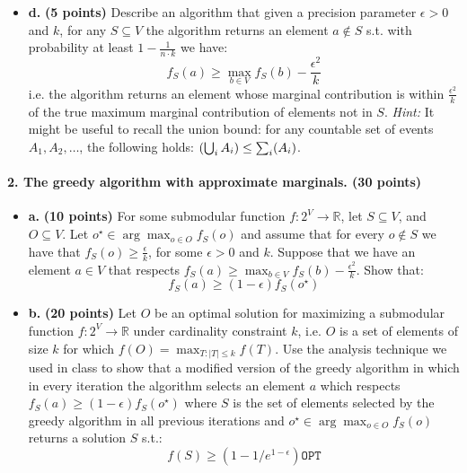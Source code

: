 \documentclass[11pt]{article}
\let\Pr\relax
\DeclareMathOperator*{\Pr}{\mathbb{P}}
\begin{document}
\begin{itemize}
		\item[] \textbf{d.} \textbf{(5 points)} Describe an algorithm that given a precision parameter $\epsilon>0$ and $k$, for any $S \subseteq V$ the algorithm returns an element $a \notin S$ s.t. with probability at least $1-\frac{1}{n\cdot k}$ we have: 
		$$f_{S}(a) \geq \max_{b\in V}f_{S}(b) -\frac{\epsilon^2}{k}$$
		i.e. the algorithm returns an element whose marginal contribution is within $\frac{\epsilon^2}{k}$ of the true maximum marginal contribution of elements not in $S$. \emph{Hint:} It might be useful to recall the union bound: for any countable set of events $A_1, A_2, \dots$, the following holds: $\Pr \left ( \bigcup_i A_i \right ) \le \sum_i \Pr(A_i)$.
	\end{itemize}
	
	
	
	\paragraph{2. The greedy algorithm with approximate marginals. (30 points)}
	\begin{itemize}
		
		\item[]\textbf{a.} \textbf{(10 points)} For some submodular function $f:2^V \to \mathbb{R}$, let $S\subseteq V$, and $O \subseteq V$.  Let $o^\star \in \arg\max_{o \in O}f_{S}(o)$ and assume that for every $o\notin S$ we have that $f_{S}(o) \geq \frac{\epsilon}{k}$, for some $\epsilon>0$ and $k$.  Suppose that we have an element $a\in V$ that respects $f_{S}(a) \geq \max_{b\in V}f_{S}(b) - \frac{\epsilon^2}{k}$.  Show that: 
		$$f_{S}(a)\geq (1-\epsilon)f_{S}(o^\star)$$
		
		\item[] \textbf{b.} \textbf{(20 points)} Let $O$ be an optimal solution for maximizing a submodular function $f:2^V \to \mathbb{R}$ under cardinality constraint $k$, i.e. $O$ is a set of elements of size $k$ for which $f(O)=
		\max_{T:|T|\leq k}f(T)$.  Use the analysis technique we used in class to show that a modified version of the greedy algorithm in which in every iteration the algorithm selects an element $a$ which respects $f_{S}(a) \geq (1-\epsilon)f_{S}(o^\star)$ where $S$ is the set of elements selected by the greedy algorithm in all previous iterations and $o^\star \in \arg\max_{o \in O} f_{S}(o)$ returns a solution $S$ s.t.:
		$$f(S) \geq (1-1/e^{1-\epsilon})\texttt{OPT}$$
	\end{itemize}
	
\end{document}
